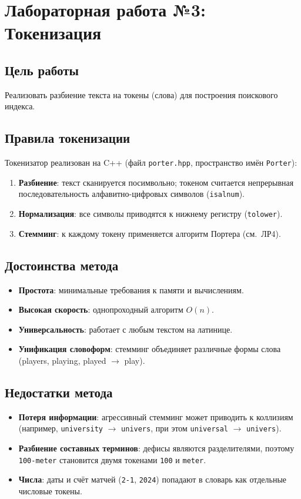 \documentclass[a4paper,12pt]{article}
\begin{document}
\section{Лабораторная работа №3: Токенизация}

\subsection{Цель работы}
Реализовать разбиение текста на токены (слова) для построения поискового индекса.

\subsection{Правила токенизации}
Токенизатор реализован на C++ (файл \texttt{porter.hpp}, пространство имён \texttt{Porter}):
\begin{enumerate}
    \item \textbf{Разбиение}: текст сканируется посимвольно; токеном считается непрерывная последовательность алфавитно-цифровых символов (\texttt{isalnum}).
    \item \textbf{Нормализация}: все символы приводятся к нижнему регистру (\texttt{tolower}).
    \item \textbf{Стемминг}: к каждому токену применяется алгоритм Портера (см.~ЛР4).
\end{enumerate}

\subsection{Достоинства метода}
\begin{itemize}
    \item \textbf{Простота}: минимальные требования к памяти и вычислениям.
    \item \textbf{Высокая скорость}: однопроходный алгоритм $O(n)$.
    \item \textbf{Универсальность}: работает с любым текстом на латинице.
    \item \textbf{Унификация словоформ}: стемминг объединяет различные формы слова (players, playing, played $\to$ play).
\end{itemize}

\subsection{Недостатки метода}
\begin{itemize}
    \item \textbf{Потеря информации}: агрессивный стемминг может приводить к коллизиям (например, \texttt{university} $\to$ \texttt{univers}, при этом \texttt{universal} $\to$ \texttt{univers}).
    \item \textbf{Разбиение составных терминов}: дефисы являются разделителями, поэтому \texttt{100-meter} становится двумя токенами \texttt{100} и \texttt{meter}.
    \item \textbf{Числа}: даты и счёт матчей (\texttt{2-1}, \texttt{2024}) попадают в словарь как отдельные числовые токены.
\end{itemize}
\end{document}
